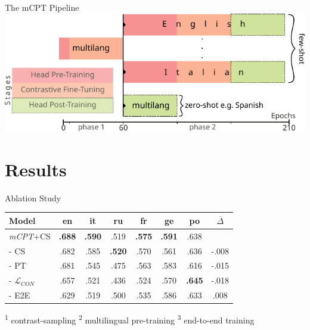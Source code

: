 \documentclass[aspectratio=169,onlytextwidth]{beamer}
\begin{document}
\begin{frame}{The mCPT Pipeline}
  \centering
  \includegraphics[height=0.6\textheight]{pipeline_hlposttrain}
\end{frame}


\section{Results}

\begin{frame}{Ablation Study}
  \centering
  \begin{tabular}{l c c c c c c c} \toprule
    Model & en & it & ru & fr & ge & po & $\overline{\Delta}$  \\ \midrule
    \rowcolor[gray]{.9} \emph{mCPT}+CS & \textbf{.688} & \textbf{.590} & .519 & \textbf{.575} & \textbf{.591} & .638 &  \\
    - CS\footnotemark[1] & .682 &  .585 & \textbf{.520} & .570 & .561 & .636 & -.008 \\
    - PT\footnotemark[2] & .681 & .545 & .475 & .563 & .583 & .616 & -.015 \\
    - $\mathcal{L}_{CON}$ & .657 & .521 & .436 & .524 & .570 & \textbf{.645} & -.018 \\
    - E2E\footnotemark[3] & .629 & .519 & .500 & .535 & .586 & .633 & .008 \\
    \bottomrule
  \end{tabular}
  \vfill
  \footnoterule \footnotesize
  \begin{minipage}[b]{\textwidth}
    \textsuperscript{1} contrast-sampling \hspace{0.3cm}
    \textsuperscript{2} multilingual pre-training \hspace{0.3cm}
    \textsuperscript{3} end-to-end training
  \end{minipage}
\end{frame}
\end{document}
